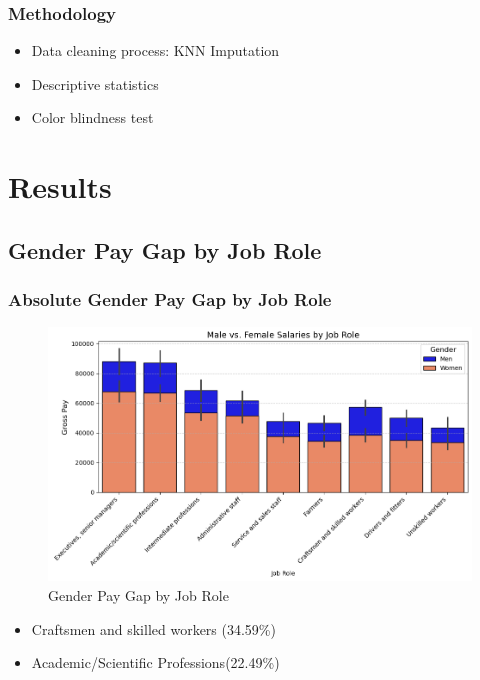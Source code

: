 \documentclass{beamer}
\begin{document}
\begin{frame}
\frametitle{Methodology}
\begin{itemize}
  \item Data cleaning process: KNN Imputation
  \item Descriptive statistics
  \item Color blindness test
  \end{itemize}  
\end{frame}

\section{Results}
\subsection{Gender Pay Gap by Job Role}
\begin{frame}
\frametitle{Absolute Gender Pay Gap by Job Role}
\begin{center}
\begin{figure}[H]
    \includegraphics[width=\textwidth]{Figures/Salaries_by_Job_Role.png}
    \caption{Gender Pay Gap by Job Role}
    \label{fig:pay_gap_roles}
\end{figure}
  \begin{itemize}
    \item Craftsmen and skilled workers (34.59\%)
    \item Academic/Scientific Professions(22.49\%)
\end{itemize} 
\end{center}
\end{frame}
\end{document}
